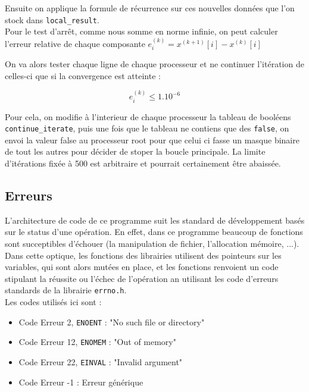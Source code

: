 \documentclass[11pt, a4paper]{article}
\begin{document}
Ensuite on applique la formule de récurrence sur ces nouvelles données que l'on stock dans \texttt{local\_result}.\\

Pour le test d'arr\^et, comme nous somme en norme infinie, on peut calculer l'erreur relative de chaque composante $e^{(k)}_{i} = x^{(k+1)}[i] - x^{(k)}[i]$

On va alors tester chaque ligne de chaque processeur et ne continuer l'itération de celles-ci que si la convergence est atteinte :

\[
e^{(k)}_{i} \leq 1.10^{-6}
\]

Pour cela, on modifie à l'interieur de chaque processeur la tableau de booléens \texttt{continue\_iterate}, puis une fois que le tableau ne contiens que des \texttt{false}, on envoi la valeur false au processeur root pour que celui ci fasse un masque binaire de tout les autres pour décider de stoper la boucle principale. La limite d'itérations fixée à 500 est arbitraire et pourrait certainement \^etre abaissée.

\subsection{Erreurs} \label{err}

L'architecture de code de ce programme suit les standard de développement basés sur le status d'une opération. En effet, dans ce programme beaucoup de fonctions sont succeptibles d'échouer (la manipulation de fichier, l'allocation mémoire, ...).\\

Dans cette optique, les fonctions des librairies  utilisent des pointeurs sur les variables, qui sont alors mutées en place, et les fonctions renvoient un code stipulant la réussite ou l'échec de l'opération an utilisant les code d'erreurs standards de la librairie \texttt{errno.h}.\\

Les codes utilisés ici sont :
\begin{itemize}
    \item Code Erreur 2, \texttt{ENOENT} : "No such file or directory"
    \item Code Erreur 12, \texttt{ENOMEM} : "Out of memory"
    \item Code Erreur 22, \texttt{EINVAL} : "Invalid argument"
    \item Code Erreur -1 : Erreur générique
\end{itemize}
\end{document}
